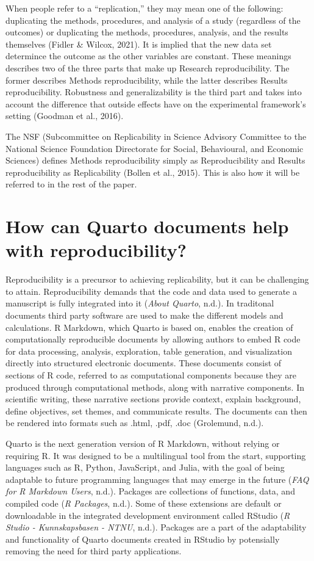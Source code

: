 \documentclass[
  a4paper,
]{article}
\begin{document}
When people refer to a ``replication,'' they may mean one of the
following: duplicating the methods, procedures, and analysis of a study
(regardless of the outcomes) or duplicating the methods, procedures,
analysis, and the results themselves (Fidler \& Wilcox, 2021). It is
implied that the new data set determince the outcome as the other
variables are constant. These meanings describes two of the three parts
that make up Research reproducibility. The former describes Methods
reproducibility, while the latter describes Results reproducibility.
Robustness and generalizability is the third part and takes into account
the difference that outside effects have on the experimental framework's
setting (Goodman et al., 2016).

The NSF (Subcommittee on Replicability in Science Advisory Committee to
the National Science Foundation Directorate for Social, Behavioural, and
Economic Sciences) defines Methods reproducibility simply as
Reproducibility and Results reproducibility as Replicability (Bollen et
al., 2015). This is also how it will be referred to in the rest of the
paper.

\section{How can Quarto documents help with
reproducibility?}\label{how-can-quarto-documents-help-with-reproducibility}

Reproducibility is a precursor to achieving replicability, but it can be
challenging to attain. Reproducibility demands that the code and data
used to generate a manuscript is fully integrated into it (\emph{About
Quarto}, n.d.). In traditonal documents third party software are used to
make the different models and calculations. R Markdown, which Quarto is
based on, enables the creation of computationally reproducible documents
by allowing authors to embed R code for data processing, analysis,
exploration, table generation, and visualization directly into
structured electronic documents. These documents consist of sections of
R code, referred to as computational components because they are
produced through computational methods, along with narrative components.
In scientific writing, these narrative sections provide context, explain
background, define objectives, set themes, and communicate results. The
documents can then be rendered into formats such as .html, .pdf, .doc
(Grolemund, n.d.).

Quarto is the next generation version of R Markdown, without relying or
requiring R. It was designed to be a multilingual tool from the start,
supporting languages such as R, Python, JavaScript, and Julia, with the
goal of being adaptable to future programming languages that may emerge
in the future (\emph{FAQ for R Markdown Users}, n.d.). Packages are
collections of functions, data, and compiled code (\emph{R Packages},
n.d.). Some of these extensions are default or downloadable in the
integrated development environment called RStudio (\emph{R Studio -
Kunnskapsbasen - NTNU}, n.d.). Packages are a part of the adaptability
and functionality of Quarto documents created in RStudio by potensially
removing the need for third party applications.
\end{document}
